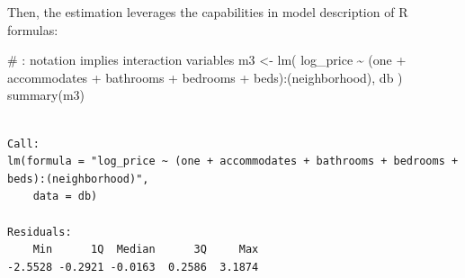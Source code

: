 \documentclass[
  letterpaper,
  DIV=11,
  numbers=noendperiod,
  oneside]{scrreprt}
\newenvironment{Shaded}{\begin{snugshade}}{\end{snugshade}}
\newcommand{\CommentTok}[1]{\textcolor[rgb]{0.37,0.37,0.37}{#1}}
\newcommand{\FunctionTok}[1]{\textcolor[rgb]{0.28,0.35,0.67}{#1}}
\newcommand{\NormalTok}[1]{\textcolor[rgb]{0.00,0.23,0.31}{#1}}
\newcommand{\OtherTok}[1]{\textcolor[rgb]{0.00,0.23,0.31}{#1}}
\newcommand{\StringTok}[1]{\textcolor[rgb]{0.13,0.47,0.30}{#1}}
\begin{document}
Then, the estimation leverages the capabilities in model description of
R formulas:

\begin{Shaded}
\begin{Highlighting}[]
\CommentTok{\# \textasciigrave{}:\textasciigrave{} notation implies interaction variables}
\NormalTok{m3 }\OtherTok{\textless{}{-}} \FunctionTok{lm}\NormalTok{(}
  \StringTok{\textquotesingle{}log\_price \textasciitilde{} (one + accommodates + bathrooms + bedrooms + beds):(neighborhood)\textquotesingle{}}\NormalTok{, }
\NormalTok{  db}
\NormalTok{)}
\FunctionTok{summary}\NormalTok{(m3)}
\end{Highlighting}
\end{Shaded}

\begin{verbatim}

Call:
lm(formula = "log_price ~ (one + accommodates + bathrooms + bedrooms + beds):(neighborhood)", 
    data = db)

Residuals:
    Min      1Q  Median      3Q     Max 
-2.5528 -0.2921 -0.0163  0.2586  3.1874 


\end{verbatim}
\end{document}
